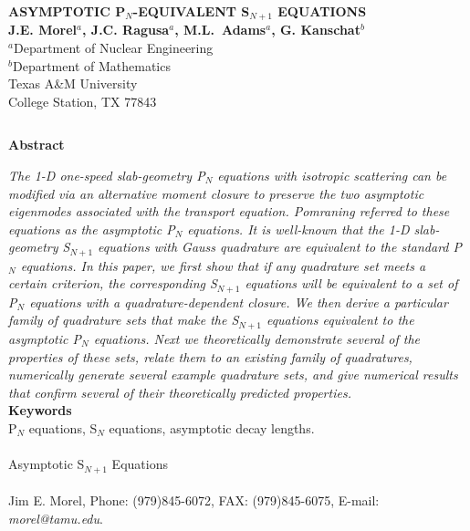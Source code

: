 \documentclass[12pt]{article}
\date{}
\newcommand{\bc}{\begin{center}}
\newcommand{\ec}{\end{center}}
\newcommand{\ess}{\doublespacing}
\begin{document}
%

\thispagestyle{empty}
\bc
{\Large \bf ASYMPTOTIC P$_N$-EQUIVALENT S$_{N+1}$ EQUATIONS}\\
\vspace{0.5in}
{\large {\bf J.E. Morel$^{a}$, J.C. Ragusa$^{a}$, M.L.\ Adams$^{a}$, G. Kanschat$^{b}$}\\
$ $\\
$^a$Department of Nuclear Engineering\\
$^b$Department of Mathematics\\
Texas A\&M University\\
College Station, TX 77843}\\
\ec
$ $\\
\bc
{\large \bf Abstract}\\
\ec
\noindent
\emph{
The 1-D one-speed slab-geometry P$_N$ equations with isotropic scattering can be 
modified via an alternative moment closure to preserve the two asymptotic eigenmodes 
associated with the transport equation.  Pomraning referred to these equations as 
the asymptotic P$_N$ equations. It is well-known that the 1-D slab-geometry S$_{N+1}$ 
equations with Gauss quadrature are equivalent to the standard P$_{N}$ equations.  
In this paper, we first show that if any quadrature set meets a certain criterion, 
the corresponding S$_{N+1}$ equations will be equivalent to a set of P$_N$ equations with a 
quadrature-dependent closure.  We then derive a particular family of quadrature sets that make 
the S$_{N+1}$ equations equivalent to the asymptotic P$_N$ equations. Next we theoretically demonstrate 
several of the properties of these sets, relate them to an existing family of quadratures, 
numerically generate several example quadrature sets, and give numerical results that 
confirm several of their theoretically predicted properties.
}\\
$ $\\
\noindent
{\bf Keywords}\\
\noindent P$_N$ equations, S$_N$ equations, asymptotic decay lengths.\\
$ $\\
\\
\noindent Asymptotic S$_{N+1}$ Equations\\
$ $\\
\\
\noindent Jim E. Morel, Phone: (979)845-6072, FAX: (979)845-6075, E-mail: \emph{morel@tamu.edu}.
$ $\\
\newpage
\ess
\end{document}
